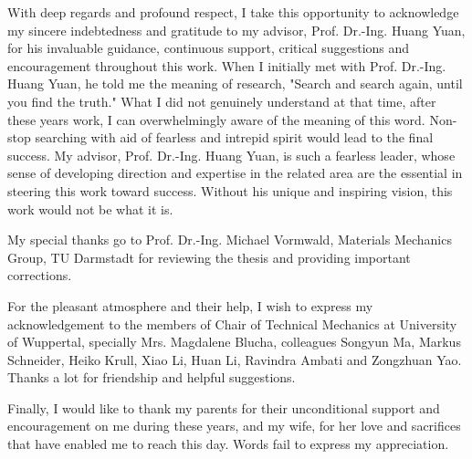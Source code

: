 

With deep regards and profound respect, I take this opportunity to acknowledge my sincere indebtedness and gratitude to my advisor, Prof. Dr.-Ing. Huang Yuan, for his invaluable guidance, continuous support, critical suggestions and encouragement throughout this work.
When I initially met with Prof. Dr.-Ing. Huang Yuan, he told me the meaning of research, "Search and search again, until you find the truth."
What I did not genuinely understand at that time, after these years work, I can overwhelmingly aware of the meaning
of this word. Non-stop searching with aid of fearless and intrepid spirit would lead to the final success.
My advisor, Prof. Dr.-Ing. Huang Yuan, is such a fearless leader, whose sense of developing direction and expertise in the related area are the essential in steering this work toward success.
Without his unique and inspiring vision, this work would not be what it is.

My special thanks go to Prof. Dr.-Ing. Michael Vormwald, Materials Mechanics Group, TU Darmstadt for reviewing the thesis and providing important corrections.

For the pleasant atmosphere and their help, I wish to express my acknowledgement to the members of Chair of Technical Mechanics at University of Wuppertal, specially Mrs. Magdalene Blucha, colleagues Songyun Ma, Markus Schneider, Heiko Krull, Xiao Li, Huan Li, Ravindra Ambati and Zongzhuan Yao. Thanks a lot for friendship and helpful suggestions.

Finally, I would like to thank my parents for their unconditional support and encouragement on me during these years, and my wife, for her love and sacrifices that have enabled me to reach this day. Words fail to express my appreciation.


